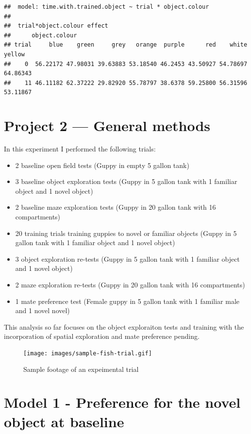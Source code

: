 \documentclass[]{book}
\providecommand{\tightlist}{%
  \setlength{\itemsep}{0pt}\setlength{\parskip}{0pt}}
\begin{document}
\begin{verbatim}
##  model: time.with.trained.object ~ trial * object.colour
## 
##  trial*object.colour effect
##      object.colour
## trial     blue    green     grey   orange  purple      red    white   yellow
##    0  56.22172 47.98031 39.63883 53.18540 46.2453 43.50927 54.78697 64.86343
##    11 46.11182 62.37222 29.82920 55.78797 38.6378 59.25800 56.31596 53.11867
\end{verbatim}

\chapter{Project 2 --- General methods}\label{project-2-general-methods}

In this experiment I performed the following trials:

\begin{itemize}
\tightlist
\item
  2 baseline open field tests (Guppy in empty 5 gallon tank)
\item
  3 baseline object exploration tests (Guppy in 5 gallon tank with 1
  familiar object and 1 novel object)
\item
  2 baseline maze exploration tests (Guppy in 20 gallon tank with 16
  compartments)
\item
  20 training trials training guppies to novel or familiar objects
  (Guppy in 5 gallon tank with 1 familiar object and 1 novel object)
\item
  3 object exploration re-tests (Guppy in 5 gallon tank with 1 familiar
  object and 1 novel object)
\item
  2 maze exploration re-tests (Guppy in 20 gallon tank with 16
  compartments)
\item
  1 mate preference test (Female guppy in 5 gallon tank with 1 familiar
  male and 1 novel novel)
\end{itemize}

This analysis so far focuses on the object exploraiton tests and
training with the incorporation of spatial exploration and mate
preference pending.

\begin{figure}
\centering
\texttt{[image: images/sample-fish-trial.gif]}
\caption{Sample footage of an expeimental trial}
\end{figure}

\chapter{Model 1 - Preference for the novel object at
baseline}\label{model-1---preference-for-the-novel-object-at-baseline}
\end{document}
